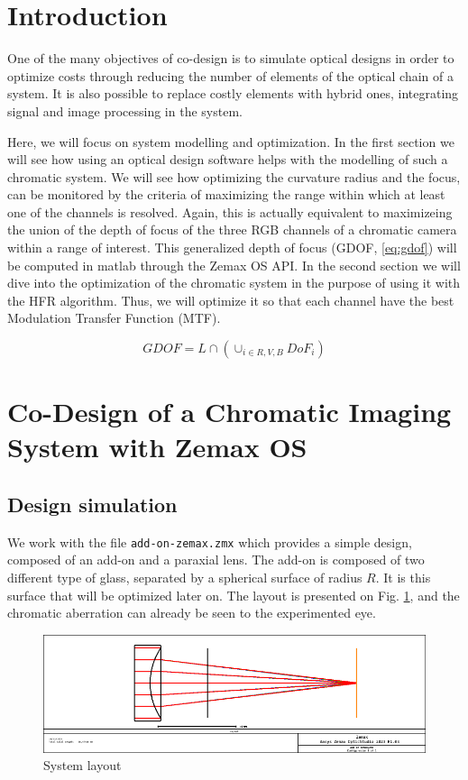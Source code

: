 \documentclass[10pt,letterpaper]{article}
\begin{document}
\section{Introduction}
One of the many objectives of co-design is to simulate optical designs in order to optimize costs through reducing the number of elements of the optical chain of a system. It is also possible to replace costly elements with hybrid ones, integrating signal and image processing in the system.

Here, we will focus on system modelling and optimization. In the first section we will see how using an optical design software helps with the modelling of such a chromatic system. We will see how optimizing the curvature radius and the focus, can be monitored by the criteria of maximizing the range within which at least one of the channels is resolved. Again, this is actually equivalent to maximizeing the union of the depth of focus of the three RGB channels of a chromatic camera within a range of interest. This generalized depth of focus (GDOF, \ref{eq:gdof}) will be computed in matlab through the Zemax OS API.  In the second section we will dive into the optimization of the chromatic system in the purpose of using it with the HFR algorithm. Thus, we will optimize it so that each channel have the best Modulation Transfer Function (MTF).

\begin{equation}\label{eq:gdof}
    G D O F=L \cap\left(\cup_{i \in R, V, B} D o F_i\right)
\end{equation}


\section{Co-Design of a Chromatic Imaging System with Zemax OS}
\subsection{Design simulation}

We work with the file \texttt{add-on-zemax.zmx} which provides a simple design, composed of an add-on and a paraxial lens. The add-on is composed of two different type of glass, separated by a spherical surface of radius $R$. It is this surface that will be optimized later on. The layout is presented on Fig. \ref{fig:layout}, and the chromatic aberration can already be seen to the experimented eye.

\begin{figure}[h]
	\centering
	\includegraphics[scale=0.6]{Layout.png}
	\caption{System layout}
	\label{fig:layout}
\end{figure}
\end{document}
